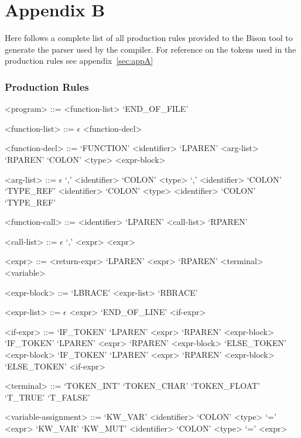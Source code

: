 \section{Appendix B}
\label{sec:appB}

Here follows a complete list of all production rules provided to the Bison tool to
generate the parser used by the \lang{} compiler. For reference on the tokens used in
the production rules see appendix~\ref{sec:appA}

\subsubsection*{Production Rules}

\begin{grammar}
<program> ::= <function-list> `END_OF_FILE'

<function-list> ::= $\epsilon$
 <function-decl>

<function-decl> ::= `FUNCTION' <identifier> `LPAREN' <arg-list> `RPAREN' `COLON' <type> <expr-block>

<arg-list> ::= $\epsilon$
 `,' <identifier> `COLON' <type>
 `,' <identifier> `COLON' `TYPE_REF'
\alt <identifier> `COLON' <type>
\alt <identifier> `COLON' `TYPE_REF'

<function-call> ::= <identifier> `LPAREN' <call-list> `RPAREN'

<call-list> ::= $\epsilon$
 `,' <expr>
\alt <expr>

<expr> ::= <return-expr>
\alt `LPAREN' <expr> `RPAREN'
\alt <terminal>
\alt <variable>

<expr-block> ::= `LBRACE' <expr-list> `RBRACE'

<expr-list> ::= $\epsilon$
 <expr> `END_OF_LINE'
 <if-expr>

<if-expr> ::= `IF_TOKEN' `LPAREN' <expr> `RPAREN' <expr-block>
\alt `IF_TOKEN' `LPAREN' <expr> `RPAREN' <expr-block> `ELSE_TOKEN' <expr-block>
\alt `IF_TOKEN' `LPAREN' <expr> `RPAREN' <expr-block> `ELSE_TOKEN' <if-expr>

<terminal> ::= `TOKEN_INT'
\alt `TOKEN_CHAR'
\alt `TOKEN_FLOAT'
\alt `T_TRUE'
\alt `T_FALSE'

<variable-assignment> ::= `KW_VAR' <identifier> `COLON' <type> `=' <expr>
\alt `KW_VAR' `KW_MUT' <identifier> `COLON' <type> `=' <expr>


\end{grammar}
